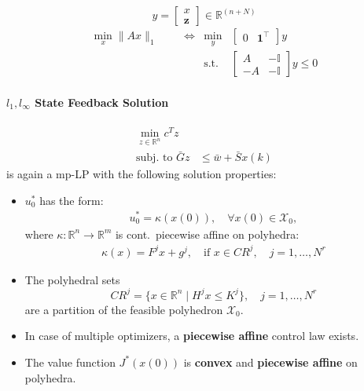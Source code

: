 \newpar{}
\begin{equation*}
    y = \begin{bmatrix}
        x \\\mathbf{z}
    \end{bmatrix}\in \mathbb{R}^{(n+N)}
\end{equation*}
\begin{align*}
    \min_x \|Ax\|_1 &  &  & \Leftrightarrow & \min_y       & \begin{bmatrix}
                                                                 0 & \mathbf{1}^\top
                                                             \end{bmatrix}y \\
                    &  &  &                 & \text{s.t. } & \begin{bmatrix}
                                                                 A  & -\mathbb{I} \\
                                                                 -A & -\mathbb{I}
                                                             \end{bmatrix}y\leq0
\end{align*}

\paragraph[l1, linf State Feedback Solution]{$l_{1}, l_{\infty}$ State Feedback Solution}
\noindent
\begin{align*}
    \min_{z\in\mathbb{R}^n}c^T z                            \\
    \text{subj.\ to } \bar{G}z & \leq \bar{w} + \bar{S}x(k)
\end{align*}
is again a mp-LP with the following solution properties:
\begin{itemize}
    \item $u_0^*$ has the form:
          \begin{align*}
              u_0^* = \kappa(x(0)), \quad \forall x(0) \in \mathcal{X}_0,
          \end{align*}
          where $\kappa : \mathbb{R}^n \to \mathbb{R}^m$ is cont.\, piecewise affine on polyhedra:
          \begin{align*}
              \kappa(x) = F^j x + g^j, \quad \text{if } x \in CR^j, \quad j = 1, \dots, N^r
          \end{align*}
    \item The polyhedral sets
          \begin{equation*}
              CR^j = \{x \in \mathbb{R}^n \mid H^j x \leq K^j\}, \quad j = 1, \dots, N^r
          \end{equation*}
          are a partition of the feasible polyhedron $\mathcal{X}_0$.
    \item In case of multiple optimizers, a \textbf{piecewise affine} control law exists.
    \item The value function $J^*(x(0))$ is \textbf{convex} and \textbf{piecewise affine} on polyhedra.
\end{itemize}

